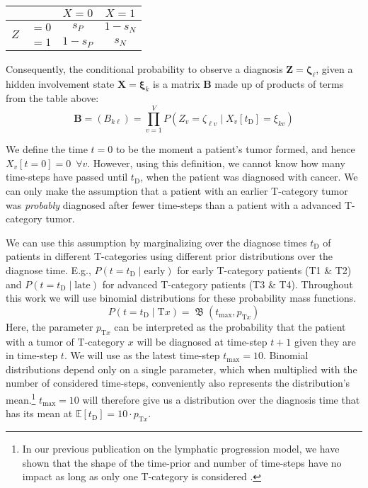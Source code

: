 \documentclass[twocolumn]{article}
\begin{document}
\begin{table}[!h]
\centering
\begin{tabular}{|cc|cc|}
    \hline
    & & $X=0$ & $X=1$ \\
    \hline
    \multirow{2}{*}{$Z$} & $=0$ & $s_P$ & $1-s_N$ \\
    & $=1$ & $1-s_P$ & $s_N$ \\
    \hline
\end{tabular}
\end{table}

Consequently, the conditional probability to observe a diagnosis $\mathbf{Z}=\boldsymbol{\zeta}_\ell$, given a hidden involvement state $\mathbf{X}=\boldsymbol{\xi}_k$ is a matrix $\mathbf{B}$ made up of products of terms from the table above:
%
\begin{equation} \label{eq:transition_matrix}
    \mathbf{B} = \left( B_{k\ell} \right) = \prod_{v=1}^V P\left( Z_v = \zeta_{\ell v} \mid X_v[t_\text{D}] = \xi_{kv} \right)
\end{equation}

We define the time $t=0$ to be the moment a patient's tumor formed, and hence $X_v[t=0]=0 \,\,\, \forall v$. However, using this definition, we cannot know how many time-steps have passed until $t_\text{D}$, when the patient was diagnosed with cancer. We can only make the assumption that a patient with an earlier T-category tumor was \emph{probably} diagnosed after fewer time-steps than a patient with a advanced T-category tumor.

We can use this assumption by marginalizing over the diagnose times $t_\text{D}$ of patients in different T-categories using different prior distributions over the diagnose time. E.g., $P \left( t=t_\text{D} \mid \text{early} \right)$ for early T-category patients (T1 \& T2) and $P \left( t=t_\text{D} \mid \text{late} \right)$ for advanced T-category patients (T3 \& T4). Throughout this work we will use binomial distributions for these probability mass functions.
%
\begin{equation} \label{eq:time_dist}
    P \left( t = t_\text{D} \mid \text{T}x \right) = \operatorname{\mathfrak{B}}(t_\text{max},p_{\text{T}x})
\end{equation}
%
Here, the parameter $p_{\text{T}x}$ can be interpreted as the probability that the patient with a tumor of T-category $x$ will be diagnosed at time-step $t+1$ given they are in time-step $t$. We will use as the latest time-step $t_\text{max} = 10$. Binomial distributions depend only on a single parameter, which when multiplied with the number of considered time-steps, conveniently also represents the distribution's mean.\footnote{In our previous publication on the lymphatic progression model, we have shown that the shape of the time-prior and number of time-steps have no impact as long as only one T-category is considered \cite{ludwig_hidden_2021}.} $t_\text{max}=10$ will therefore give us a distribution over the diagnosis time that has its mean at $\mathbb{E}[t_\text{D}] = 10 \cdot p_{\text{T}x}$.
\end{document}
